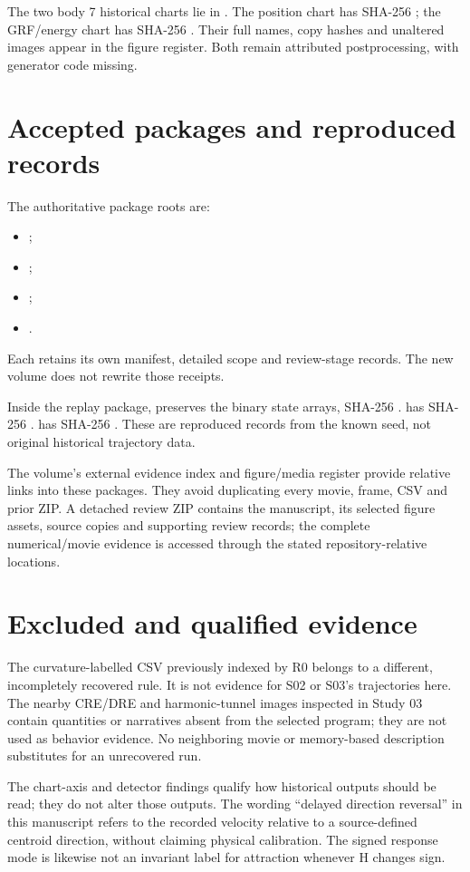 The two body 7 historical charts lie in
.
The position chart has SHA-256
;
the GRF/energy chart has SHA-256
.
Their full names, copy hashes and unaltered images appear in the
figure register. Both remain attributed postprocessing, with
generator code missing.

\section{Accepted packages and reproduced records}
The authoritative package roots are:
\begin{itemize}
\item {};
\item {};
\item {};
\item {}.
\end{itemize}
Each retains its own manifest, detailed scope and review-stage
records. The new volume does not rewrite those receipts.

Inside the replay package,  preserves
the binary state arrays, SHA-256
.
 has SHA-256
.
 has SHA-256
.
These are reproduced records from the known seed, not original
historical trajectory data.

The volume's external evidence index and figure/media register
provide relative links into these packages. They avoid duplicating
every movie, frame, CSV and prior ZIP. A detached review ZIP contains
the manuscript, its selected figure assets, source copies and
supporting review records; the complete numerical/movie evidence
is accessed through the stated repository-relative locations.

\section{Excluded and qualified evidence}
The curvature-labelled CSV previously indexed by R0 belongs to a
different, incompletely recovered rule. It is not evidence for
S02 or S03's trajectories here. The nearby CRE/DRE and harmonic-tunnel
images inspected in Study 03 contain quantities or narratives absent
from the selected program; they are not used as behavior evidence.
No neighboring movie or memory-based description substitutes for
an unrecovered run.

The chart-axis and detector findings qualify how historical outputs
should be read; they do not alter those outputs. The wording
“delayed direction reversal” in this manuscript refers to the
recorded velocity relative to a source-defined centroid direction,
without claiming physical calibration. The signed response mode
is likewise not an invariant label for attraction whenever H
changes sign.
